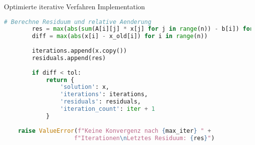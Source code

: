 \begin{examplecode}{Optimierte iterative Verfahren Implementation}
\begin{lstlisting}[language=Python, style=basesmol]
        # Berechne Residuum und relative Aenderung
        res = max(abs(sum(A[i][j] * x[j] for j in range(n)) - b[i]) for i in range(n))
        diff = max(abs(x[i] - x_old[i]) for i in range(n))
        
        iterations.append(x.copy())
        residuals.append(res)
        
        if diff < tol:
            return {
                'solution': x,
                'iterations': iterations,
                'residuals': residuals,
                'iteration_count': iter + 1
            }
            
    raise ValueError(f"Keine Konvergenz nach {max_iter} " + 
                    f"Iterationen\nLetztes Residuum: {res}")
\end{lstlisting}
\end{examplecode}







